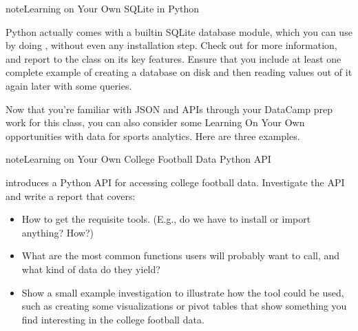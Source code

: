 \documentclass[letterpaper,10pt,english]{jupyterBook}
\begin{document}
\begin{sphinxadmonition}{note}{Learning on Your Own \sphinxhyphen{} SQLite in Python}

\sphinxAtStartPar
Python actually comes with a built\sphinxhyphen{}in SQLite database module, which you can use by doing , without even any installation step.  Check out  for more information, and report to the class on its key features.  Ensure that you include at least one complete example of creating a database on disk and then reading values out of it again later with some queries.
\end{sphinxadmonition}

\sphinxAtStartPar
Now that you’re familiar with JSON and APIs through your DataCamp prep work for this class, you can also consider some Learning On Your Own opportunities with data for sports analytics.  Here are three examples.

\begin{sphinxadmonition}{note}{Learning on Your Own \sphinxhyphen{} College Football Data Python API}

\sphinxAtStartPar
{} introduces a Python API for accessing college football data.  Investigate the API and write a report that covers:
\begin{itemize}
\item {} 
\sphinxAtStartPar
How to get the requisite tools.  (E.g., do we have to install or import anything?  How?)

\item {} 
\sphinxAtStartPar
What are the most common functions users will probably want to call, and what kind of data do they yield?

\item {} 
\sphinxAtStartPar
Show a small example investigation to illustrate how the tool could be used, such as creating some visualizations or pivot tables that show something you find interesting in the college football data.

\end{itemize}
\end{sphinxadmonition}
\end{document}
